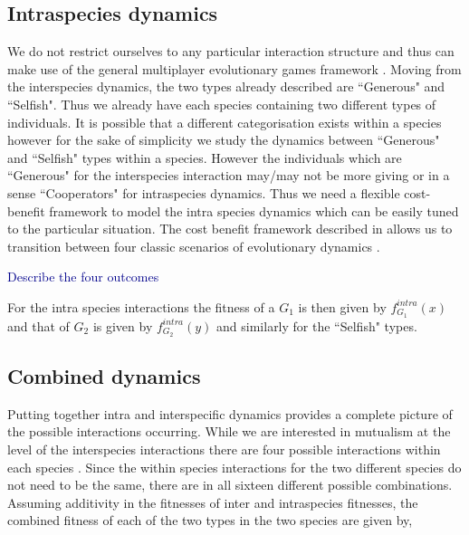 \documentclass{pnastwo}
\newcommand{\cha}[1]{\textcolor{darkblue}{#1}}
\begin{document}
\begin{article}
\subsection{Intraspecies dynamics}

We do not restrict ourselves to any particular interaction structure and thus can make use of the general multiplayer evolutionary games framework \cite{gokhale:PNAS:2010,gokhale:DGAA:2014}.
Moving from the interspecies dynamics, the two types already described are ``Generous" and ``Selfish".
Thus we already have each species containing two different types of individuals.
It is possible that a different categorisation exists within a species however for the sake of simplicity we study the dynamics between ``Generous" and ``Selfish" types within a species.
However the individuals which are ``Generous" for the interspecies interaction may/may not be more giving or in a sense ``Cooperators" for intraspecies dynamics.
Thus we need a flexible cost-benefit framework to model the intra species dynamics which can be easily tuned to the particular situation.
The cost benefit framework described in \cite{eshel:AmNat:1988,hauert:JTB:2006a}
 allows us to transition between four classic scenarios of evolutionary dynamics \cite{nowak:Science:2004}.

\cha{Describe the four outcomes}

For the intra species interactions the fitness of a $G_1$ is then given by $f^{intra}_{G_1} (x)$ and that of $G_2$ is given by $f^{intra}_{G_2} (y)$ and similarly for the ``Selfish" types.

\subsection{Combined dynamics}

Putting together intra and interspecific dynamics provides a complete picture of the possible interactions occurring. While we are interested in mutualism at the level of the interspecies interactions there are four possible interactions within each species \cite{nowak:Science:2004,hauert:JTB:2006a}. Since the within species interactions for the two different species do not need to be the same, there are in all sixteen different possible combinations.
Assuming additivity in the fitnesses of inter and intraspecies fitnesses, the combined fitness of each of the two types in the two species are given by,


\end{article}
\end{document}
